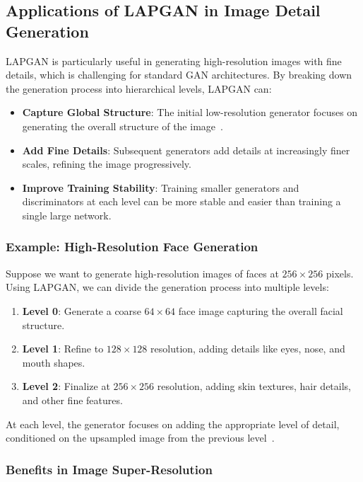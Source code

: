 \subsection{Applications of LAPGAN in Image Detail Generation}

LAPGAN is particularly useful in generating high-resolution images with fine details, which is challenging for standard GAN architectures. By breaking down the generation process into hierarchical levels, LAPGAN can:

\begin{itemize}
    \item \textbf{Capture Global Structure}: The initial low-resolution generator focuses on generating the overall structure of the image~\cite{cao2015grarep}.
    \item \textbf{Add Fine Details}: Subsequent generators add details at increasingly finer scales, refining the image progressively.
    \item \textbf{Improve Training Stability}: Training smaller generators and discriminators at each level can be more stable and easier than training a single large network.
\end{itemize}

\subsubsection{Example: High-Resolution Face Generation}

Suppose we want to generate high-resolution images of faces at \( 256 \times 256 \) pixels. Using LAPGAN, we can divide the generation process into multiple levels:

\begin{enumerate}
    \item \textbf{Level 0}: Generate a coarse \( 64 \times 64 \) face image capturing the overall facial structure.
    \item \textbf{Level 1}: Refine to \( 128 \times 128 \) resolution, adding details like eyes, nose, and mouth shapes.
    \item \textbf{Level 2}: Finalize at \( 256 \times 256 \) resolution, adding skin textures, hair details, and other fine features.
\end{enumerate}

At each level, the generator focuses on adding the appropriate level of detail, conditioned on the upsampled image from the previous level~\cite{denton2015deep}.

\subsubsection{Benefits in Image Super-Resolution}

